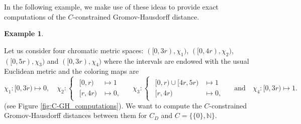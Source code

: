 \documentclass[8pt,a4paper,oneside,english,english]{article}
\theoremstyle{plain}
\theoremstyle
{plain}
\theoremstyle{definition}
\newtheorem{example}[theorem]{Example}%
\newcommand{\N}{\mathbb{N}}
\begin{document}
In the following example, we make use of these ideas to provide exact computations of the $C$-constrained Gromov-Hausdorff distance.

\begin{example}\label{ex:C-GH_computations}
    
    Let us consider four chromatic metric spaces: $([0,3r),\chi_1)$, $([0,4r),\chi_2)$, $([0,5r),\chi_3)$ and $([0,3r),\chi_4)$ where the intervals are endowed with the usual Euclidean metric and the coloring maps are
    \[
        \chi_1\colon[0,3r)\mapsto 0,\quad\chi_2\colon\begin{cases}
            \begin{aligned}
                [0,r) &\mapsto 1\\
                [r,4r) &\mapsto 0,
            \end{aligned}
        \end{cases}
        \quad \chi_3\colon\begin{cases}
            \begin{aligned}
                [0,r)\cup[4r,5r) &\mapsto 1\\
                [r,4r) &\mapsto 0,
            \end{aligned}
        \end{cases}
        \quad\text{and}\quad\chi_4\colon[0,3r)\mapsto 1.
    \]
    (see Figure \ref{fig:C-GH_computations}). We want to compute the $C$-constrained Gromov-Hausdorff distances between them for $C_D$ and $C=\{\{0\},\N\}$.
    \begin{figure}[h!]
        \centering
\end{figure}
\end{example}
\end{document}
